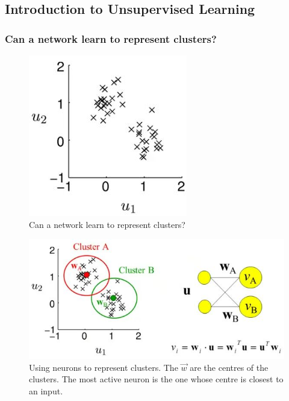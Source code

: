 \documentclass[]{article}
\begin{document}
\subsection{Introduction to Unsupervised Learning}

\subsubsection{Can a network learn to represent clusters?}
\begin{figure}[H]
	\caption{Can a network learn to represent clusters?}
	\includegraphics[width=\textwidth]{clustered-data}
\end{figure}

\begin{figure}[H]
	\caption[Using neurons to represent clusters]{Using neurons to represent clusters. The $\vec{w}$ are the centres of the clusters. The most active neuron is the one whose centre is closest to an input.}
	\includegraphics[width=\textwidth]{neurons-clusters}
\end{figure}
\end{document}
